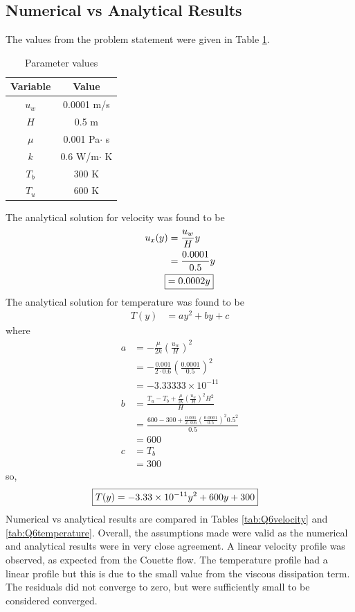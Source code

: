 \subsection*{Numerical vs Analytical Results}
The values from the problem statement were given in Table \ref{tab:Q6values}.
\begin{table}[h]
    \centering
    \caption{Parameter values}
    \begin{tabular}{cc}
        \toprule
        Variable & Value \\
        \midrule
        $u_w$ & 0.0001 m/s \\
        $H$ & 0.5 m \\
        $\mu$ & 0.001 Pa$\cdot$ s \\
        $k$ & 0.6 W/m$\cdot$ K \\
        $T_b$ & 300 K \\
        $T_u$ & 600 K \\
        \bottomrule
    \end{tabular}
    \label{tab:Q6values}
\end{table}
The analytical solution for velocity was found to be 
\begin{align*}
    u_x(y) &= \frac{u_w}{H} y \\
    &= \frac{0.0001}{0.5} y \\
    \Aboxed{&= 0.0002 y}
\end{align*}
The analytical solution for temperature was found to be
\begin{align*}
    T(y) &= a y^2 + b y + c
\end{align*}
where
\begin{align*}
    a &= -\frac{\mu}{2k} \left(\frac{u_w}{H}\right)^2 \\
    &= -\frac{0.001}{2 \cdot 0.6} \left(\frac{0.0001}{0.5}\right)^2 \\
    &= -3.33333 \times 10^{-11} \\
    b &= \frac{T_u - T_b + \frac{\mu}{2k} \left(\frac{u_w}{H}\right)^2 H^2}{H} \\
    &= \frac{600 - 300 + \frac{0.001}{2 \cdot 0.6} \left(\frac{0.0001}{0.5}\right)^2 0.5^2}{0.5} \\
    &= 600 \\
    c &= T_b \\
    &= 300
\end{align*}
so, 
\begin{align*}
    \Aboxed{T(y) &= -3.33 \times 10^{-11} y^2 + 600 y + 300}
\end{align*}
Numerical vs analytical results are compared in Tables \ref{tab:Q6velocity} and \ref{tab:Q6temperature}. Overall, the assumptions made were valid as the numerical and analytical results were in very close agreement. A linear velocity profile was observed, as expected from the Couette flow. The temperature profile had a linear profile but this is due to the small value from the viscous dissipation term. The residuals did not converge to zero, but were sufficiently small to be considered converged.

